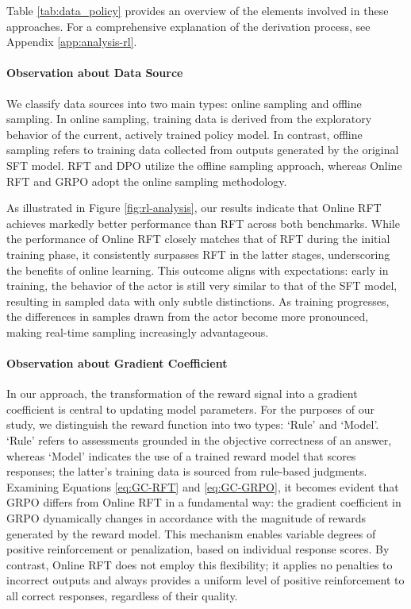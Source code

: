 \begin{itemize}[topsep=0pt]
Table \ref{tab:data_policy} provides an overview of the elements involved in these approaches. For a comprehensive explanation of the derivation process, see Appendix \ref{app:analysis-rl}.

\paragraph{Observation about Data Source} We classify data sources into two main types: online sampling and offline sampling. In online sampling, training data is derived from the exploratory behavior of the current, actively trained policy model. In contrast, offline sampling refers to training data collected from outputs generated by the original SFT model. RFT and DPO utilize the offline sampling approach, whereas Online RFT and GRPO adopt the online sampling methodology.

As illustrated in Figure \ref{fig:rl-analysis}, our results indicate that Online RFT achieves markedly better performance than RFT across both benchmarks. While the performance of Online RFT closely matches that of RFT during the initial training phase, it consistently surpasses RFT in the latter stages, underscoring the benefits of online learning. This outcome aligns with expectations: early in training, the behavior of the actor is still very similar to that of the SFT model, resulting in sampled data with only subtle distinctions. As training progresses, the differences in samples drawn from the actor become more pronounced, making real-time sampling increasingly advantageous.

\paragraph{Observation about Gradient Coefficient} In our approach, the transformation of the reward signal into a gradient coefficient is central to updating model parameters. For the purposes of our study, we distinguish the reward function into two types: ‘Rule’ and ‘Model’. ‘Rule’ refers to assessments grounded in the objective correctness of an answer, whereas ‘Model’ indicates the use of a trained reward model that scores responses; the latter’s training data is sourced from rule-based judgments. Examining Equations \ref{eq:GC-RFT} and \ref{eq:GC-GRPO}, it becomes evident that GRPO differs from Online RFT in a fundamental way: the gradient coefficient in GRPO dynamically changes in accordance with the magnitude of rewards generated by the reward model. This mechanism enables variable degrees of positive reinforcement or penalization, based on individual response scores. By contrast, Online RFT does not employ this flexibility; it applies no penalties to incorrect outputs and always provides a uniform level of positive reinforcement to all correct responses, regardless of their quality.


\end{itemize}
